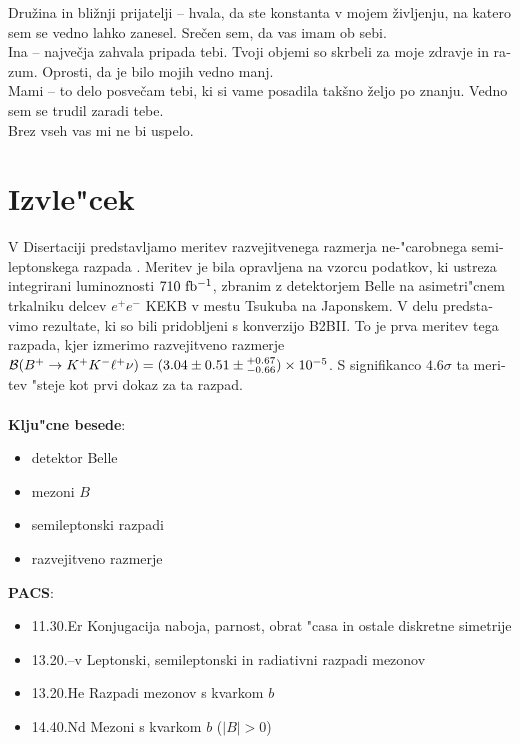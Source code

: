 \begin{otherlanguage}{slovene}
\noindent Družina in bližnji prijatelji -- hvala, da ste konstanta v mojem življenju, na katero sem se vedno lahko zanesel. Srečen sem, da vas imam ob sebi.\\

\noindent Ina -- največja zahvala pripada tebi. Tvoji objemi so skrbeli za moje zdravje in razum. Oprosti, da je bilo mojih vedno manj.\\

\noindent Mami -- to delo posvečam tebi, ki si vame posadila takšno željo po znanju. Vedno sem se trudil zaradi tebe.\\

\hfill Brez vseh vas mi ne bi uspelo.


\pagestyle{empty}


\cleardoublepage
\chapter*{Izvle"cek}
V Disertaciji predstavljamo meritev razvejitvenega razmerja ne-"carobnega semileptonskega razpada \decayb. Meritev je bila opravljena na vzorcu podatkov, ki ustreza integrirani luminoznosti $710\mathrm{~fb^{-1}}$, zbranim z detektorjem Belle na asimetri"cnem trkalniku delcev $e^+e^-$ KEKB v mestu Tsukuba na Japonskem. V delu predstavimo rezultate, ki so bili pridobljeni s konverzijo B2BII. To je prva meritev tega razpada, kjer izmerimo razvejitveno razmerje $\mathcal{B}(B^+ \to K^+ K^- \ell^+ \nu) = (3.04 \pm 0.51 \pm {}^{+0.67}_{-0.66})\times 10^{-5}$. S signifikanco $4.6\sigma$ ta meritev "steje kot prvi dokaz za ta razpad.\\
\vspace{1cm}\\
{{\bf Klju"cne besede}:}
\begin{itemize}
	\item detektor Belle
	\item mezoni $B$
	\item semileptonski razpadi
	\item razvejitveno razmerje
\end{itemize}
\vspace{1cm}
{{\bf PACS}:}
\begin{itemize}
	\item 11.30.Er Konjugacija naboja, parnost, obrat "casa in ostale diskretne simetrije
	\item 13.20.--v Leptonski, semileptonski in radiativni razpadi mezonov
	\item 13.20.He Razpadi mezonov s kvarkom $b$
	\item 14.40.Nd Mezoni s kvarkom $b$ ($|B|>0$) 
\end{itemize}
\end{otherlanguage}

